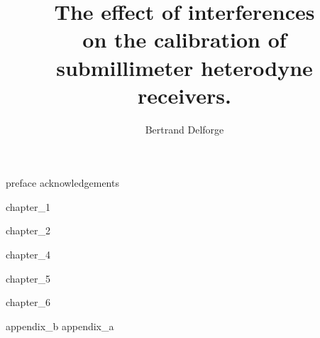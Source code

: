 \documentclass[a4paper,11pt]{book}
\title{
    The effect of interferences\\
    on the calibration of\\
    submillimeter heterodyne receivers.\\
}
\author{Bertrand Delforge}
\newif\ifDraft
\begin{document}
\pagestyle{fancy}

\frontmatter

\maketitle

\ifDraft
    \renewcommand*\contentsname{Content \today}
\fi

\tableofcontents
{preface}
{acknowledgements}

\mainmatter

{chapter_1}

{chapter_2}


{chapter_4}

{chapter_5}

{chapter_6}

\begin{appendices}
   {appendix_b}
   {appendix_a}
\end{appendices}

\backmatter

%


\cleardoublepage
{}
\printbibliography
\end{document}
